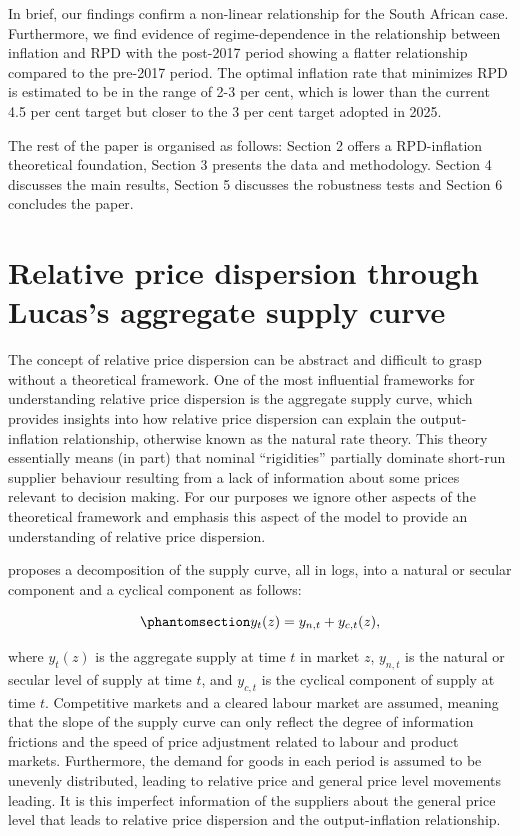 \documentclass[
  letterpaper,
  DIV=11,
  numbers=noendperiod]{scrartcl}
\begin{document}
In brief, our findings confirm a non-linear relationship for the South
African case. Furthermore, we find evidence of regime-dependence in the
relationship between inflation and RPD with the post-2017 period showing
a flatter relationship compared to the pre-2017 period. The optimal
inflation rate that minimizes RPD is estimated to be in the range of 2-3
per cent, which is lower than the current 4.5 per cent target but closer
to the 3 per cent target adopted in 2025.

The rest of the paper is organised as follows: Section 2 offers a
RPD-inflation theoretical foundation, Section 3 presents the data and
methodology. Section 4 discusses the main results, Section 5 discusses
the robustness tests and Section 6 concludes the paper.

\section{Relative price dispersion through Lucas's aggregate supply
curve}\label{relative-price-dispersion-through-lucass-aggregate-supply-curve}

The concept of relative price dispersion can be abstract and difficult
to grasp without a theoretical framework. One of the most influential
frameworks for understanding relative price dispersion is the
\citet{lucas1973} aggregate supply curve, which provides insights into
how relative price dispersion can explain the output-inflation
relationship, otherwise known as the natural rate theory. This theory
essentially means (in part) that nominal ``rigidities'' partially
dominate short-run supplier behaviour resulting from a lack of
information about some prices relevant to decision making. For our
purposes we ignore other aspects of the theoretical framework and
emphasis this aspect of the model to provide an understanding of
relative price dispersion.

\citet{lucas1973} proposes a decomposition of the supply curve, all in
logs, into a natural or secular component and a cyclical component as
follows:

\begin{equation}\phantomsection\label{eq-lucas_supply_curve}{y_t(z) = y_{n,t} + y_{c,t}(z), }\end{equation}

where \(y_t(z)\) is the aggregate supply at time \(t\) in market \(z\),
\(y_{n,t}\) is the natural or secular level of supply at time \(t\), and
\(y_{c,t}\) is the cyclical component of supply at time \(t\).
Competitive markets and a cleared labour market are assumed, meaning
that the slope of the supply curve can only reflect the degree of
information frictions and the speed of price adjustment related to
labour and product markets. Furthermore, the demand for goods in each
period is assumed to be unevenly distributed, leading to relative price
and general price level movements leading. It is this imperfect
information of the suppliers about the general price level that leads to
relative price dispersion and the output-inflation relationship.
\end{document}
